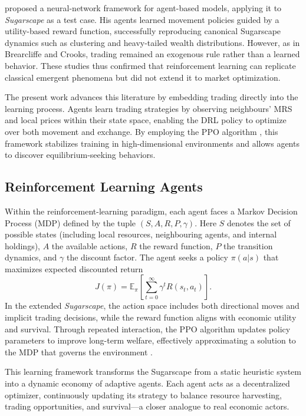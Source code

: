\documentclass[pdflatex,sn-mathphys-num]{sn-jnl}%
\theoremstyle{thmstyleone}%
\theoremstyle{thmstyletwo}%
\theoremstyle{thmstylethree}%
\begin{document}
\citet{Jager2021} proposed a neural-network framework for agent-based models, applying it to \textit{Sugarscape} as a test case.  
His agents learned movement policies guided by a utility-based reward function, successfully reproducing canonical Sugarscape dynamics such as clustering and heavy-tailed wealth distributions.  
However, as in Brearcliffe and Crooks, trading remained an exogenous rule rather than a learned behavior.  
These studies thus confirmed that reinforcement learning can replicate classical emergent phenomena but did not extend it to market optimization.

The present work advances this literature by embedding trading directly into the learning process.  
Agents learn trading strategies by observing neighbours’ MRS and local prices within their state space, enabling the DRL policy to optimize over both movement and exchange.  
By employing the PPO algorithm \citep{Schulman2017}, this framework stabilizes training in high-dimensional environments and allows agents to discover equilibrium-seeking behaviors.


\subsection{Reinforcement Learning Agents}
Within the reinforcement-learning paradigm, each agent faces a Markov Decision Process (MDP) defined by the tuple \((S,A,R,P,\gamma)\).  
Here \(S\) denotes the set of possible states (including local resources, neighbouring agents, and internal holdings), \(A\) the available actions, \(R\) the reward function, \(P\) the transition dynamics, and \(\gamma\) the discount factor.  
The agent seeks a policy \(\pi(a|s)\) that maximizes expected discounted return
\[
J(\pi)=\mathbb{E}_{\pi}\!\left[\sum_{t=0}^{\infty}\gamma^{t}R(s_t,a_t)\right].
\]
In the extended \textit{Sugarscape}, the action space includes both directional moves and implicit trading decisions, while the reward function aligns with economic utility and survival.  
Through repeated interaction, the PPO algorithm updates policy parameters to improve long-term welfare, effectively approximating a solution to the MDP that governs the environment \citep{Schulman2017}.

This learning framework transforms the Sugarscape from a static heuristic system into a dynamic economy of adaptive agents.  
Each agent acts as a decentralized optimizer, continuously updating its strategy to balance resource harvesting, trading opportunities, and survival—a closer analogue to real economic actors.
\end{document}
